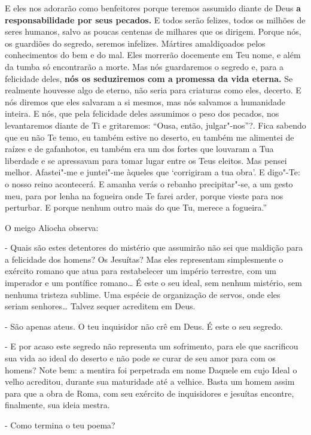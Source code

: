 E eles nos adorarão como benfeitores porque teremos assumido diante de
Deus \textbf{a responsabilidade por seus pecados.} E todos serão
felizes, todos os milhões de seres humanos, salvo as poucas centenas de
milhares que os dirigem. Porque nós, os guardiões do segredo, seremos
infelizes. Mártires amaldiçoados pelos conhecimentos do bem e do mal.
Eles morrerão docemente em Teu nome, e além da tumba só encontrarão a
morte. Mas nós guardaremos o segredo e, para a felicidade deles,
\textbf{nós os seduziremos com a promessa da vida eterna.} Se realmente
houvesse algo de eterno, não seria para criaturas como eles, decerto. E
nós diremos que eles salvaram a si mesmos, mas nós salvamos a humanidade
inteira. E nós, que pela felicidade deles assumimos o peso dos pecados,
nos levantaremos diante de Ti e gritaremos: ``Ousa, então,
julgar"-nos''?. Fica sabendo que eu não Te temo, eu também estive no
deserto, eu também me alimentei de raízes e de gafanhotos, eu também era
um dos fortes que louvaram a Tua liberdade e se apressavam para tomar
lugar entre os Teus eleitos. Mas pensei melhor. Afastei"-me e juntei"-me
àqueles que `corrigiram a tua obra'. E digo"-Te: o nosso reino
acontecerá. E amanha verás o rebanho precipitar"-se, a um gesto meu, para
por lenha na fogueira onde Te farei arder, porque vieste para nos
perturbar. E porque nenhum outro mais do que Tu, merece a fogueira.''

O meigo Aliocha observa:

- Quais são estes detentores do mistério que assumirão não sei que
maldição para a felicidade dos homens? Os Jesuítas? Mas eles representam
simplesmente o exército romano que atua para restabelecer um império
terrestre, com um imperador e um pontífice romano\ldots{} É este o seu ideal,
sem nenhum mistério, sem nenhuma tristeza sublime. Uma espécie de
organização de servos, onde eles seriam senhores\ldots{} Talvez sequer
acreditem em Deus.

- São apenas ateus. O teu inquisidor não crê em Deus. É este o seu
segredo.

- E por acaso este segredo não representa um sofrimento, para ele que
sacrificou sua vida ao ideal do deserto e não pode se curar de seu amor
para com os homens? Note bem: a mentira foi perpetrada em nome Daquele
em cujo Ideal o velho acreditou, durante sua maturidade até a velhice.
Basta um homem assim para que a obra de Roma, com seu exército de
inquisidores e jesuítas encontre, finalmente, sua ideia mestra.

- Como termina o teu poema?

